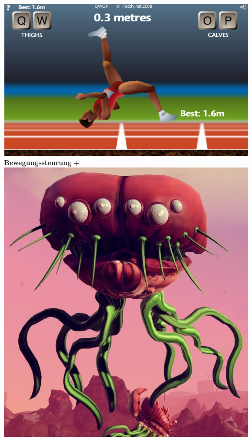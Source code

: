\documentclass{beamer}
\begin{document}
\begin{frame}
	\begin{columns}[c]
		\centering		
		\includegraphics[width=\textwidth]{img/games/qwop.png} \\
		\vspace{1.5em}
		\textbf{Bewegungssteurung}
		\centering
		\textbf{\huge +}
		\centering
		\includegraphics[width=\textwidth]{img/games/nms3.jpg} \\

\end{columns}
\end{frame}
\end{document}
